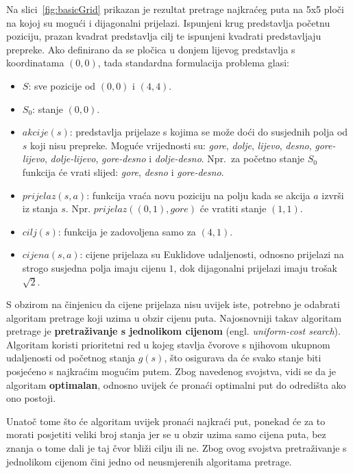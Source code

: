 \documentclass[times, utf8, zavrsni, numeric]{fer}
\begin{document}
Na slici~\ref{fig:basicGrid} prikazan je rezultat pretrage najkraćeg puta na 5x5 ploči na kojoj su mogući i dijagonalni prijelazi.
Ispunjeni krug predstavlja početnu poziciju, prazan kvadrat predstavlja cilj te ispunjeni kvadrati predstavljaju prepreke.
Ako definirano da se pločica u donjem lijevog predstavlja s koordinatama \((0, 0)\), tada standardna formulacija problema glasi:
\begin{itemize}
    \item \(S\): sve pozicije od \((0, 0)\) i \((4, 4)\).
    \item \(S_0\): stanje \((0, 0)\).
    \item \(akcije(s)\): predstavlja prijelaze s kojima se može doći do susjednih polja od \(s\) koji nisu prepreke. 
    Moguće vrijednosti su: \textit{gore}, \textit{dolje}, \textit{lijevo}, \textit{desno}, \textit{gore-lijevo}, \textit{dolje-lijevo}, \textit{gore-desno} i \textit{dolje-desno}. 
    Npr.\ za početno stanje \(S_0\) funkcija će vrati slijed: \textit{gore}, \textit{desno} i \textit{gore-desno}. 
    \item \(prijelaz(s, a)\): funkcija vraća novu poziciju na polju kada se akcija \(a\) izvrši iz stanja \(s\). Npr. \(prijelaz((0, 1), gore)\) će vratiti stanje \((1, 1)\).
    \item \(cilj(s)\): funkcija je zadovoljena samo za \((4, 1)\).
    \item \(cijena(s, a)\): cijene prijelaza su Euklidove udaljenosti, odnosno prijelazi na strogo susjedna polja imaju cijenu \(1\), dok dijagonalni prijelazi imaju trošak \(\sqrt{2}\).
\end{itemize}

\par S obzirom na činjenicu da cijene prijelaza nisu uvijek iste, potrebno je odabrati algoritam pretrage koji uzima u obzir cijenu puta.
Najosnovniji takav algoritam pretrage je \textbf{pretraživanje s jednolikom cijenom} (engl. \textit{uniform-cost search}). 
Algoritam koristi prioritetni red u kojeg stavlja čvorove s njihovom ukupnom udaljenosti od početnog stanja \(g(s)\), što osigurava da će svako stanje biti posjećeno s najkraćim mogućim putem.
Zbog navedenog svojstva, vidi se da je algoritam \textbf{optimalan}, odnosno uvijek će pronaći optimalni put do odredišta ako ono postoji.

\par Unatoč tome što će algoritam uvijek pronaći najkraći put, ponekad će za to morati posjetiti veliki broj stanja jer se u obzir uzima samo cijena puta, bez znanja o tome dali je taj čvor bliži cilju ili ne. 
Zbog ovog svojstva pretraživanje s jednolikom cijenom čini jedno od neusmjerenih algoritama pretrage.
\end{document}
